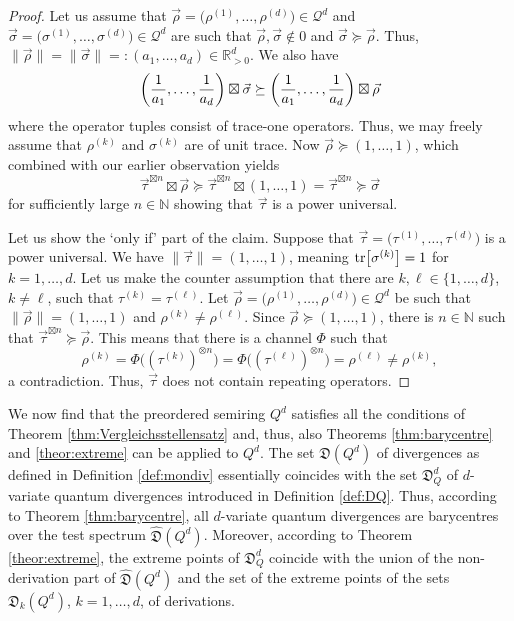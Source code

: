 \documentclass[12pt,a4paper,reqno]{amsart}
\theoremstyle{definition}
\newcommand{\mc}[1]{\mathcal{#1}}
\newcommand{\mf}[1]{\mathfrak{#1}}
\newcommand{\N}{\mathbb N}
\newcommand{\R}{\mathbb R}
\newcommand{\tr}[1]{\mathrm{tr}\left[#1\right]} %
\let\originalleft\left
\let\originalright\right
\renewcommand{\left}{\mathopen{}\mathclose\bgroup\originalleft}
\renewcommand{\right}{\aftergroup\egroup\originalright}
\begin{document}
\begin{proof}
Let us assume that $\vec{\rho}=\big(\rho^{(1)},\ldots,\rho^{(d)}\big)\in\mc Q^d$ and $\vec{\sigma}=\big(\sigma^{(1)},\ldots,\sigma^{(d)}\big)\in\mc Q^d$ are such that $\vec{\rho},\vec{\sigma}\notin 0$ and $\vec{\sigma}\succeq\vec{\rho}$. Thus, $\|\vec{\rho}\|=\|\vec{\sigma}\|=:(a_1,\ldots,a_d)\in\R_{>0}^d$. We also have
$$
\left(\frac{1}{a_1},\ldots,\frac{1}{a_d}\right)\boxtimes\vec{\sigma}\succeq\left(\frac{1}{a_1},\ldots,\frac{1}{a_d}\right)\boxtimes\vec{\rho}
$$
where the operator tuples consist of trace-one operators. Thus, we may freely assume that $\rho^{(k)}$ and $\sigma^{(k)}$ are of unit trace. Now $\vec{\rho}\succeq(1,\ldots,1)$, which combined with our earlier observation yields
$$
\vec{\tau}^{\boxtimes n}\boxtimes\vec{\rho}\succeq\vec{\tau}^{\boxtimes n}\boxtimes(1,\ldots,1)=\vec{\tau}^{\boxtimes n}\succeq\vec{\sigma}
$$
for sufficiently large $n\in\N$ showing that $\vec{\tau}$ is a power universal.

Let us show the `only if' part of the claim. Suppose that $\vec{\tau}=\big(\tau^{(1)},\ldots,\tau^{(d)}\big)$ is a power universal. We have $\|\vec{\tau}\|=(1,\ldots,1)$, meaning $\tr{\sigma^{(k)}}=1$ for $k=1,\ldots,d$. Let us make the counter assumption that there are $k,\ell\in\{1,\ldots,d\}$, $k\neq\ell$, such that $\tau^{(k)}=\tau^{(\ell)}$. Let $\vec{\rho}=\big(\rho^{(1)},\ldots,\rho^{(d)}\big)\in\mc Q^d$ be such that $\|\vec{\rho}\|=(1,\ldots,1)$ and $\rho^{(k)}\neq\rho^{(\ell)}$. Since $\vec{\rho}\succeq(1,\ldots,1)$, there is $n\in\N$ such that $\vec{\tau}^{\boxtimes n}\succeq\vec{\rho}$. This means that there is a channel $\Phi$ such that
$$
\rho^{(k)}=\Phi\big((\tau^{(k)})^{\otimes n}\big)=\Phi\big((\tau^{(\ell)})^{\otimes n}\big)=\rho^{(\ell)}\neq\rho^{(k)},
$$
a contradiction. Thus, $\vec{\tau}$ does not contain repeating operators.
\end{proof}

We now find that the preordered semiring $Q^d$ satisfies all the conditions of Theorem \ref{thm:Vergleichsstellensatz} and, thus, also Theorems \ref{thm:barycentre} and \ref{theor:extreme} can be applied to $Q^d$. The set $\mf D(Q^d)$ of divergences as defined in Definition \ref{def:mondiv} essentially coincides with the set $\mf D_Q^d$ of $d$-variate quantum divergences introduced in Definition \ref{def:DQ}. Thus, according to Theorem \ref{thm:barycentre}, all $d$-variate quantum divergences are barycentres over the test spectrum $\hat{\mf D}(Q^d)$. Moreover, according to Theorem \ref{theor:extreme}, the extreme points of $\mf D_Q^d$ coincide with the union of the non-derivation part of $\hat{\mf D}(Q^d)$ and the set of the extreme points of the sets $\mf D_k(Q^d)$, $k=1,\ldots,d$, of derivations.
\end{document}
